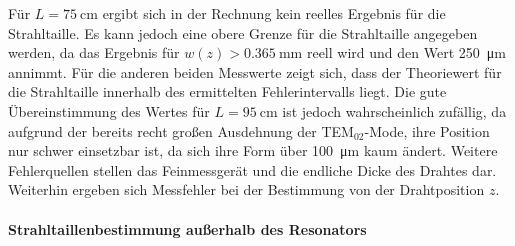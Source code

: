 \documentclass[a4paper,twoside,final]{article}
\begin{document}


Für $L = \SI{75}{\centi\metre}$ ergibt sich in der Rechnung kein reelles Ergebnis für die Strahltaille. Es kann jedoch eine obere Grenze für die Strahltaille angegeben werden, da das Ergebnis für $w(z) > \SI{0.365}{\milli\metre}$ reell wird und den Wert \SI{250}{\micro\metre} annimmt. Für die anderen beiden Messwerte zeigt sich, dass der Theoriewert für die Strahltaille innerhalb des ermittelten Fehlerintervalls liegt. Die gute Übereinstimmung des Wertes für $L = \SI{95}{\centi\metre}$ ist jedoch wahrscheinlich zufällig, da aufgrund der bereits recht großen Ausdehnung der TEM$_{02}$-Mode, ihre Position nur schwer einsetzbar ist, da sich ihre Form über \SI{100}{\micro\metre} kaum ändert. Weitere Fehlerquellen stellen das Feinmessgerät und die endliche Dicke des Drahtes dar. Weiterhin ergeben sich Messfehler bei der Bestimmung von der Drahtposition $z$.

\paragraph{Strahltaillenbestimmung außerhalb des Resonators}$~$
\end{document}
